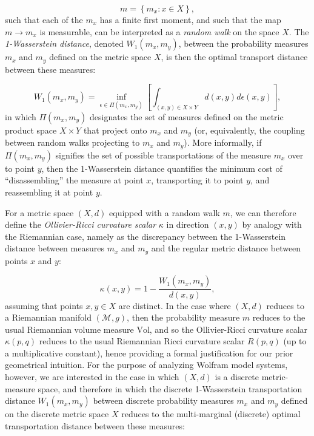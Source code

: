\documentclass{article}
\begin{document}
\begin{equation}
m = \left\lbrace m_x : x \in X \right\rbrace,
\end{equation}
such that each of the ${m_x}$ has a finite first moment, and such that the map ${m \to m_x}$ is measurable, can be interpreted as a \textit{random walk} on the space $X$. The \textit{1-Wasserstein distance}, denoted ${W_1 \left( m_x, m_y \right)}$, between the probability measures ${m_x}$ and ${m_y}$ defined on the metric space $X$, is then the optimal transport distance between these measures:

\begin{equation}
W_1 \left( m_x, m_y \right) = \inf_{\epsilon \in \Pi \left( m_x, m_y \right)} \left[ \int_{\left( x, y \right) \in X \times Y} d \left( x, y \right) d \epsilon \left( x, y \right) \right],
\end{equation}
in which ${\Pi \left( m_x, m_y \right)}$ designates the set of measures defined on the metric product space ${X \times Y}$ that project onto ${m_x}$ and ${m_y}$ (or, equivalently, the coupling between random walks projecting to ${m_x}$ and ${m_y}$). More informally, if ${\Pi \left( m_x, m_y \right)}$ signifies the set of possible transportations of the measure ${m_x}$ over to point $y$, then the 1-Wasserstein distance quantifies the minimum cost of ``disassembling'' the measure at point $x$, transporting it to point $y$, and reassembling it at point $y$.

For a metric space ${\left( X, d \right)}$ equipped with a random walk $m$, we can therefore define the \textit{Ollivier-Ricci curvature scalar} ${\kappa}$ in direction ${\left( x, y \right)}$ by analogy with the Riemannian case, namely as the discrepancy between the 1-Wasserstein distance between measures ${m_x}$ and ${m_y}$ and the regular metric distance between points $x$ and $y$:

\begin{equation}
\kappa \left( x, y \right) = 1 - \frac{W_1 \left( m_x, m_y \right)}{d \left( x, y \right)},
\end{equation}
assuming that points ${x, y \in X}$ are distinct. In the case where ${\left( X, d \right)}$ reduces to a Riemannian manifold ${\left( \mathcal{M}, g \right)}$, then the probability measure $m$ reduces to the usual Riemannian volume measure ${\mathrm{Vol}}$, and so the Ollivier-Ricci curvature scalar ${\kappa \left(p, q \right)}$ reduces to the usual Riemannian Ricci curvature scalar ${R \left( p, q \right)}$ (up to a multiplicative constant), hence providing a formal justification for our prior geometrical intuition. For the purpose of analyzing Wolfram model systems, however, we are interested in the case in which ${\left( X, d \right)}$ is a discrete metric-measure space, and therefore in which the discrete 1-Wasserstein transportation distance ${W_1 \left( m_x, m_y \right)}$ between discrete probability measures ${m_x}$ and ${m_y}$ defined on the discrete metric space $X$ reduces to the multi-marginal (discrete) optimal transportation distance between these measures:
\end{document}
